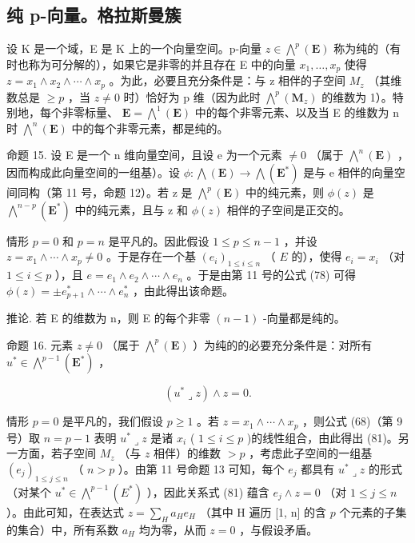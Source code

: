 \subsection{纯 p-向量。格拉斯曼簇}

设 K 是一个域，E 是 K 上的一个向量空间。p-向量 \(z \in \bigwedge^{p}(\mathbf{E})\) 称为纯的（有时也称为可分解的），如果它是非零的并且存在 E 中的向量 \(x_{1}, \ldots, x_{p}\) 使得 \(z = x_{1} \wedge x_{2} \wedge \cdots \wedge x_{p}\) 。为此，必要且充分条件是：与 z 相伴的子空间 \(M_{z}\) （其维数总是 \(\geqslant p\) ，当 \(z \neq 0\) 时）恰好为 p 维（因为此时 \(\bigwedge^{p}(\mathbf{M}_{z})\) 的维数为 1）。特别地，每个非零标量、 \(\mathbf{E} = \bigwedge^{1}(\mathbf{E})\) 中的每个非零元素、以及当 E 的维数为 n 时 \(\bigwedge^{n}(\mathbf{E})\) 中的每个非零元素，都是纯的。

命题 15. 设 E 是一个 n 维向量空间，且设 e 为一个元素 \(\neq0\) （属于 \(\bigwedge^{n}(\mathbf{E})\) ，因而构成此向量空间的一组基）。设 \(\phi:\bigwedge(\mathbf{E})\to\bigwedge(\mathbf{E}^{*})\) 是与 e 相伴的向量空间同构（第 11 号，命题 12）。若 z 是 \(\bigwedge^{p}(\mathbf{E})\) 中的纯元素，则 \(\phi(z)\) 是 \(\bigwedge^{n-p}(\mathbf{E}^{*})\) 中的纯元素，且与 z 和 \(\phi(z)\) 相伴的子空间是正交的。

情形 \(p = 0\) 和 \(p = n\) 是平凡的。因此假设 \(1 \leqslant p \leqslant n - 1\) ，并设 \(z = x_1 \wedge \cdots \wedge x_p \neq 0\) 。于是存在一个基 \((e_i)_{1 \leqslant i \leqslant n}\) （ \(E\) 的），使得 \(e_i = x_i\) （对 \(1 \leqslant i \leqslant p\) ），且 \(e = e_1 \wedge e_2 \wedge \cdots \wedge e_n\) 。于是由第 11 号的公式 (78) 可得 \(\phi(z) = \pm e_{p+1}^* \wedge \cdots \wedge e_n^*\) ，由此得出该命题。

推论. 若 E 的维数为 n，则 E 的每个非零 \((n - 1)\) -向量都是纯的。

命题 16. 元素 \(z \neq 0\) （属于 \(\bigwedge^{p}(\mathbf{E})\) ）为纯的的必要充分条件是：对所有 \(u^{*} \in \bigwedge^{p-1}(\mathbf{E}^{*})\) ，

\[
(u ^ {*} \lrcorner z) \wedge z = 0.\tag{81}
\]

情形 \(p = 0\) 是平凡的，我们假设 \(p \geqslant 1\) 。若 \(z = x_1 \wedge \cdots \wedge x_p\) ，则公式 (68)（第 9 号）取 \(n = p - 1\) 表明 \(u^* \lrcorner z\) 是诸 \(x_i\) ( \(1 \leqslant i \leqslant p\) )的线性组合，由此得出 (81)。另一方面，若子空间 \(M_z\) （与 \(z\) 相伴）的维数 \(>p\) ，考虑此子空间的一组基 \((e_j)_{1 \leqslant j \leqslant n}\) （ \(n >p\) ）。由第 11 号命题 13 可知，每个 \(e_j\) 都具有 \(u^* \lrcorner z\) 的形式（对某个 \(u^* \in \bigwedge^{p-1}(E^*)\) ），因此关系式 (81) 蕴含 \(e_j \wedge z = 0\) （对 \(1 \leqslant j \leqslant n\) ）。由此可知，在表达式 \(z = \sum_{H} a_H e_H\) （其中 H 遍历 {[}1, n{]} 的含 \(p\) 个元素的子集的集合）中，所有系数 \(a_H\) 均为零，从而 \(z = 0\) ，与假设矛盾。

